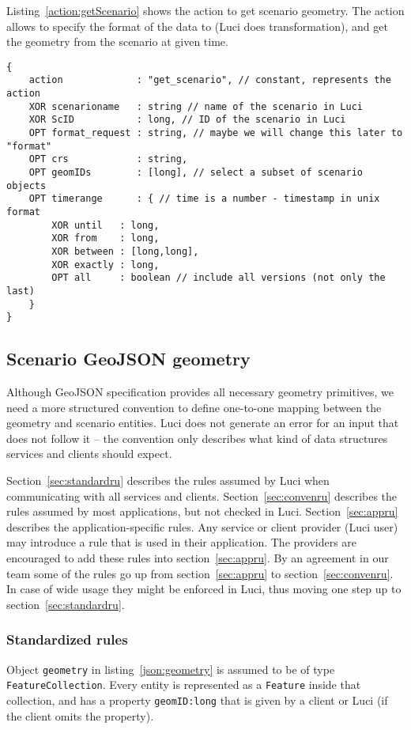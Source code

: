 Listing~\ref{action:getScenario} shows the action to get scenario geometry.
The action allows to specify the format of the data to (\ac{Luci} does transformation),
and get the geometry from the scenario at given time.
\begin{lstlisting}[caption={JSON action structure for getting a scenario from \ac{Luci}}, label={action:getScenario}]
{
	action             : "get_scenario", // constant, represents the action
	XOR scenarioname   : string // name of the scenario in Luci
	XOR ScID           : long, // ID of the scenario in Luci
	OPT format_request : string, // maybe we will change this later to "format"
	OPT crs            : string,
	OPT geomIDs        : [long], // select a subset of scenario objects
	OPT timerange      : { // time is a number - timestamp in unix format
		XOR until   : long,
		XOR from    : long,
		XOR between : [long,long],
		XOR exactly : long,
		OPT all     : boolean // include all versions (not only the last)
	}
}
\end{lstlisting}

\subsection{Scenario GeoJSON geometry}
\label{sec:services:scenario}

Although GeoJSON specification provides all necessary geometry primitives,
we need a more structured convention to define one-to-one mapping between the geometry and scenario entities.
\ac{Luci} does not generate an error for an input that does not follow it -- the convention only describes what kind of data structures services and clients should expect.

Section~\ref{sec:standardru} describes the rules assumed by \ac{Luci} when communicating with all services and clients.
Section~\ref{sec:convenru} describes the rules assumed by most applications, but not checked in \ac{Luci}.
Section~\ref{sec:appru} describes the application-specific rules.
Any service or client provider (\ac{Luci} user) may introduce a rule that is used in their application.
The providers are encouraged to add these rules into section~\ref{sec:appru}.
By an agreement in our team some of the rules go up from section~\ref{sec:appru} to section~\ref{sec:convenru}.
In case of wide usage they might be enforced in \ac{Luci}, thus moving one step up to section~\ref{sec:standardru}.

\subsubsection{Standardized rules}
\label{sec:services:standardru}
Object \texttt{geometry} in listing~\ref{json:geometry} is assumed to be of type \texttt{FeatureCollection}.
Every entity is represented as a \texttt{Feature} inside that collection, and has a property \texttt{geomID:\color{blue}long} that is given by a client or \ac{Luci} (if the client omits the property).

